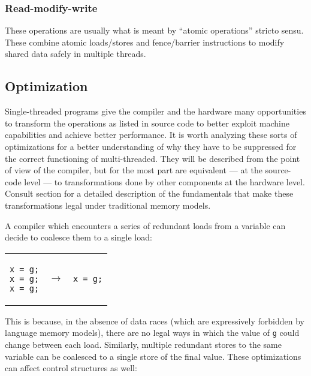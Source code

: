 \subsubsection{Read-modify-write}

These operations are usually what is meant by ``atomic operations'' stricto
sensu.  These combine atomic loads/stores and fence/barrier instructions to
modify shared data safely in multiple threads.

\subsection{Optimization}

Single-threaded programs give the compiler and the hardware many opportunities
to transform the operations as listed in source code to better exploit machine
capabilities and achieve better performance.  It is worth analyzing these sorts
of optimizations for a better understanding of why they have to be suppressed
for the correct functioning of multi-threaded.  They will be described from the
point of view of the compiler, but for the most part are equivalent --- at the
source-code level --- to transformations done by other components at the
hardware level.  Consult section  for a detailed
description of the fundamentals that make these transformations legal under
traditional memory models.

A compiler which encounters a series of redundant loads from a variable can
decide to coalesce them to a single load:

\begin{center}
    \begin{tabular}{ccc}
        \begin{lstlisting}[style=c]
x = g;
x = g;
x = g;
        \end{lstlisting}
        & $\to$ &
        \begin{lstlisting}[style=c]
x = g;
        \end{lstlisting} \\[1.25em]
    \end{tabular}
\end{center}

This is because, in the absence of data races (which are expressively forbidden
by language memory models), there are no legal ways in which the value of
\texttt{g} could change between each load.  Similarly, multiple redundant stores
to the same variable can be coalesced to a single store of the final value.
These optimizations can affect control structures as well:


